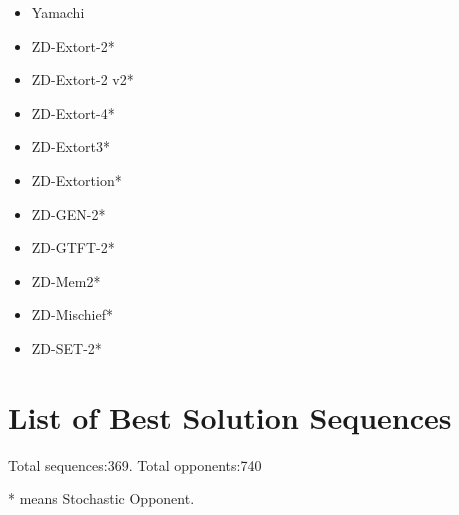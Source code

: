 \begin{appendices}
\begin{multicols}{4}
\begin{itemize}
            \item Yamachi
            \item ZD-Extort-2*
            \item ZD-Extort-2 v2*
            \item ZD-Extort-4*
            \item ZD-Extort3*
            \item ZD-Extortion*
            \item ZD-GEN-2*
            \item ZD-GTFT-2*
            \item ZD-Mem2*
            \item ZD-Mischief*
            \item ZD-SET-2*
        \end{itemize}
    \end{multicols}

    \chapter{List of Best Solution Sequences}\label{apndx:solutionGroups}
    Total sequences:369. Total opponents:740

    * means Stochastic Opponent.


\end{appendices}
